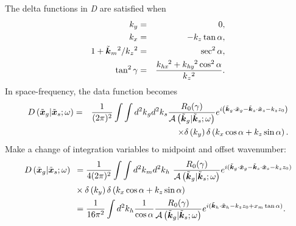 The delta functions in \textit{D} are satisfied when
\begin{eqnarray}\text{\textit{$k_y$}} & = & 0,\nonumber\\
\text{\textit{$k_x$}} & = & - \text{\textit{$k_{z }$}}\tan  \alpha ,\nonumber\\
1+\tilde{\boldsymbol{k}}_{\text{\textit{$m$}}}{}^2/
\text{\textit{$k$}}_{\text{\textit{$z$}}}{}^2 & = & \sec ^2\alpha ,\nonumber\\
\tan ^2\gamma & = & \frac{\text{\textit{$k_{\text{hx}}$}}{}^2+\text{\textit{$k_{\text{hy}}$}}{}^2\cos
^2\alpha }{\text{\textit{$k$}}_{\text{\textit{$z$}}}{}^2}.\end{eqnarray}
In space-frequency, the data function becomes
\begin{eqnarray}
\text{\textit{$D$}}\left(\tilde{\boldsymbol{x}}_g|\tilde{\boldsymbol{x}}_s; \omega
\right) & = & \frac{1}{(2\pi )^2}\int \int d^2\text{\textit{$k$}}_{\text{\textit{$g$}}}d^2\text{\textit{$k$}}_{\text{\textit{$s$}}} \frac{ \text{\textit{$R$}}_0(\gamma
)}{\mathcal{A}\left(\tilde{\boldsymbol{k}}_{\text{\textit{$g$}}}|
\tilde{\boldsymbol{k}}_{\text{\textit{$s$}}};\omega
\right)}e^{i \left(\tilde{\boldsymbol k}_g\cdot \tilde{\boldsymbol x}_g-{\tilde{\boldsymbol k}_s\cdot \tilde{\boldsymbol x}_s}-k_zz_0\right)}
\nonumber\\
 && \times  \delta \left(\text{\textit{$k_y$}}\right)\delta \left(\text{\textit{$k_x$}}\cos  \alpha +\text{\textit{$k_z$}}\sin  \alpha \right).
\end{eqnarray}
Make a change of integration variables to midpoint and offset wavenumber:
\begin{align}\text{\textit{$D$}}\left(\tilde{\boldsymbol{x}}_g|\tilde{\boldsymbol{x}}_s;\omega
\right)\text{  } & =  \frac{1}{4(2\pi )^2}\int \int d^2\text{\textit{$k$}}_{\text{\textit{$m$}}}d^2\text{\textit{$k$}}_{\text{\textit{$h$}}}
\text{  }\frac{\text{\textit{$R$}}_0(\gamma
)}{\mathcal{A}\left(\tilde{\boldsymbol{k}}_{\text{\textit{$g$}}}|
\tilde{\boldsymbol{k}}_{\text{\textit{$s$}}};\omega
\right)}e^{i (\tilde{\boldsymbol k}_g\cdot \tilde{\boldsymbol{x}}_g-\tilde{\boldsymbol k}_s\cdot \tilde{\boldsymbol{x}}_s-k_zz_0)}\nonumber\\
& \times  \delta \left(\text{\textit{$k_y$}}\right)
 \delta \left(\text{\textit{$k_x$}}\cos  \alpha
+\text{\textit{$k_z$}}\sin  \alpha \right)
\nonumber\\
& = \frac{1}{16\pi ^2}\int d^2\text{\textit{$k$}}_{\text{\textit{$h$}}} \frac{1}{\cos  \alpha } \frac{\text{\textit{$R$}}_0(\gamma )}{\mathcal{A}\left(\tilde{\boldsymbol{k}}_{\text{\textit{$g$}}}|
\tilde{\boldsymbol{k}}_{\text{\textit{$s$}}};\omega
\right)}e^{i (\tilde{\boldsymbol k}_h\cdot \tilde{\boldsymbol{x}}_h-k_zz_0+x_m\tan  \alpha )}.\end{align}

